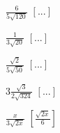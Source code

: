 \begin{esercizio}[\Ast]
\begin{multicols}{4}
\begin{enumeratea}
 \item $\frac 6{5\sqrt{120}}$
  \hfill $\left[...\right]$
 \item $\frac 1{3\sqrt{20}}$
  \hfill $\left[...\right]$
 \item $\frac{\sqrt 2}{5\sqrt{50}}$
  \hfill $\left[...\right]$
 \item $3\frac{\sqrt 3}{2\sqrt{324}}$
  \hfill $\left[...\right]$
 \item $\frac x{3\sqrt{2x}}$
  \hfill $\left[\frac{\sqrt{2x}} 6\right]$
 \end{enumeratea}
 \end{multicols}
\end{esercizio}

\newpage %


